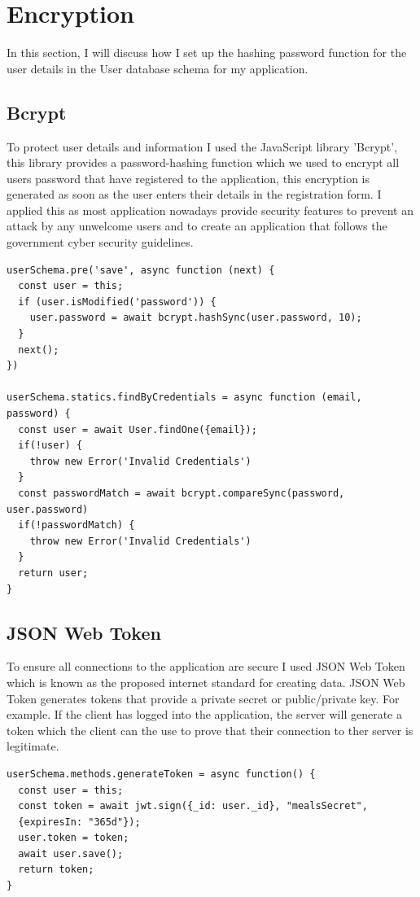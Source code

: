 \section{Encryption}

In this section, I will discuss how I set up the hashing password function for the user details in the User database schema for my application.

\subsection{Bcrypt}

To protect user details and information I used the JavaScript library 'Bcrypt', this library provides a password-hashing function which we used to encrypt all users password that have registered to the application, this encryption is generated as soon as the user enters their details in the registration form. I applied this as most application nowadays provide security features to prevent an attack by any unwelcome users and to create an application that follows the government cyber security guidelines.

\begin{verbatim}
userSchema.pre('save', async function (next) {
  const user = this;
  if (user.isModified('password')) {
    user.password = await bcrypt.hashSync(user.password, 10);
  }
  next();
})

userSchema.statics.findByCredentials = async function (email, password) {
  const user = await User.findOne({email});
  if(!user) {
    throw new Error('Invalid Credentials')
  }
  const passwordMatch = await bcrypt.compareSync(password, user.password)
  if(!passwordMatch) {
    throw new Error('Invalid Credentials')
  }
  return user;
}
\end{verbatim}

\subsection{JSON Web Token}

To ensure all connections to the application are secure I used JSON Web Token which is known as the proposed internet standard for creating data. JSON Web Token generates tokens that provide a private secret or public/private key. For example. If the client has logged into the application, the server will generate a token which the client can the use to prove that their connection to ther server is legitimate.

\begin{verbatim}
userSchema.methods.generateToken = async function() {
  const user = this;
  const token = await jwt.sign({_id: user._id}, "mealsSecret", 
  {expiresIn: "365d"});
  user.token = token;
  await user.save();
  return token;
}
\end{verbatim}

